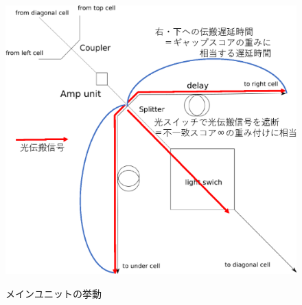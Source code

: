 \begin{description}
\begin{figure}[t!]
\begin{center}
{\includegraphics[keepaspectratio,scale=0.4]{fig/3/lightracelogic_cell_6_5.eps}}
\caption{メインユニットの挙動}
\label{fig:mainunit}
\end{center}
\end{figure}
\end{description}

